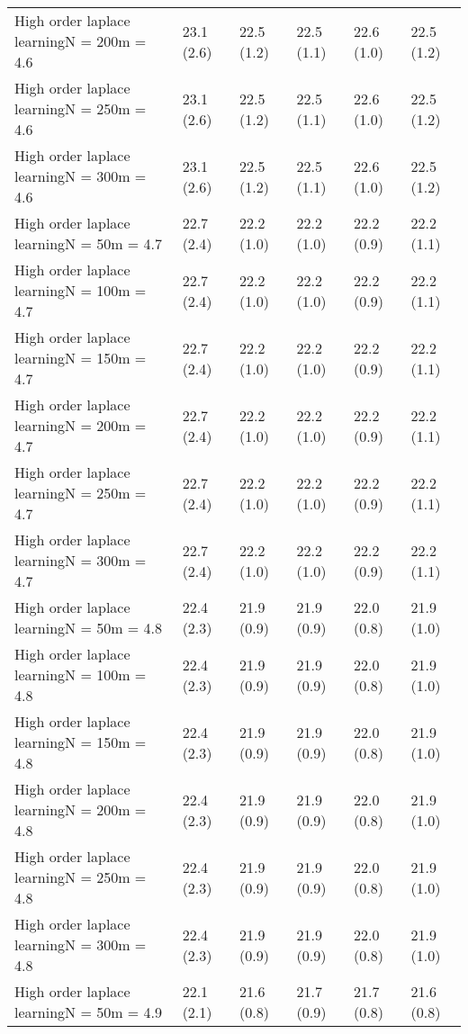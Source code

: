 \documentclass{article}
\begin{document}
\begin{table*}[t!]
\begin{center}
\begin{small}
\begin{sc}
\begin{tabular}{llllll}
High order laplace learningN = 200m = 4.6&23.1 (2.6)      &22.5 (1.2)      &22.5 (1.1)      &22.6 (1.0)      &22.5 (1.2)      \\
High order laplace learningN = 250m = 4.6&23.1 (2.6)      &22.5 (1.2)      &22.5 (1.1)      &22.6 (1.0)      &22.5 (1.2)      \\
High order laplace learningN = 300m = 4.6&23.1 (2.6)      &22.5 (1.2)      &22.5 (1.1)      &22.6 (1.0)      &22.5 (1.2)      \\
High order laplace learningN = 50m = 4.7&22.7 (2.4)      &22.2 (1.0)      &22.2 (1.0)      &22.2 (0.9)      &22.2 (1.1)      \\
High order laplace learningN = 100m = 4.7&22.7 (2.4)      &22.2 (1.0)      &22.2 (1.0)      &22.2 (0.9)      &22.2 (1.1)      \\
High order laplace learningN = 150m = 4.7&22.7 (2.4)      &22.2 (1.0)      &22.2 (1.0)      &22.2 (0.9)      &22.2 (1.1)      \\
High order laplace learningN = 200m = 4.7&22.7 (2.4)      &22.2 (1.0)      &22.2 (1.0)      &22.2 (0.9)      &22.2 (1.1)      \\
High order laplace learningN = 250m = 4.7&22.7 (2.4)      &22.2 (1.0)      &22.2 (1.0)      &22.2 (0.9)      &22.2 (1.1)      \\
High order laplace learningN = 300m = 4.7&22.7 (2.4)      &22.2 (1.0)      &22.2 (1.0)      &22.2 (0.9)      &22.2 (1.1)      \\
High order laplace learningN = 50m = 4.8&22.4 (2.3)      &21.9 (0.9)      &21.9 (0.9)      &22.0 (0.8)      &21.9 (1.0)      \\
High order laplace learningN = 100m = 4.8&22.4 (2.3)      &21.9 (0.9)      &21.9 (0.9)      &22.0 (0.8)      &21.9 (1.0)      \\
High order laplace learningN = 150m = 4.8&22.4 (2.3)      &21.9 (0.9)      &21.9 (0.9)      &22.0 (0.8)      &21.9 (1.0)      \\
High order laplace learningN = 200m = 4.8&22.4 (2.3)      &21.9 (0.9)      &21.9 (0.9)      &22.0 (0.8)      &21.9 (1.0)      \\
High order laplace learningN = 250m = 4.8&22.4 (2.3)      &21.9 (0.9)      &21.9 (0.9)      &22.0 (0.8)      &21.9 (1.0)      \\
High order laplace learningN = 300m = 4.8&22.4 (2.3)      &21.9 (0.9)      &21.9 (0.9)      &22.0 (0.8)      &21.9 (1.0)      \\
High order laplace learningN = 50m = 4.9&22.1 (2.1)      &21.6 (0.8)      &21.7 (0.9)      &21.7 (0.8)      &21.6 (0.8)      \\

\end{tabular}
\end{sc}
\end{small}
\end{center}
\end{table*}
\end{document}
